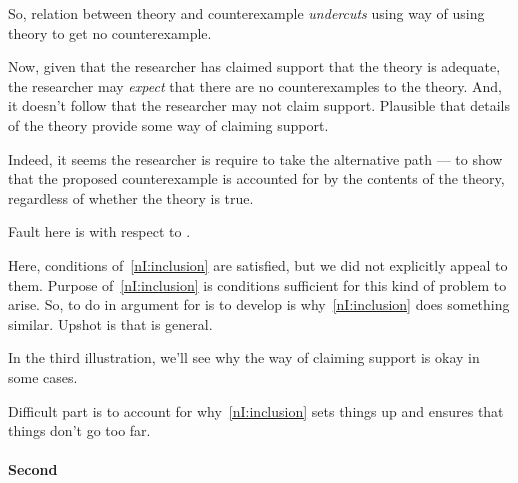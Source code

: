 \begin{note}
  So, relation between theory and counterexample \emph{undercuts} using way of using theory to get no counterexample.

  Now, given that the researcher has claimed support that the theory is adequate, the researcher may \emph{expect} that there are no counterexamples to the theory.
  And, it doesn't follow that the researcher may not claim support.
  Plausible that details of the theory provide some way of claiming support.

  Indeed, it seems the researcher is require to take the alternative path --- to show that the proposed counterexample is accounted for by the contents of the theory, regardless of whether the theory is true.

  Fault here is with respect to \ideaCS{}.
  {
    \color{red}
    Here, conditions of~\ref{nI:inclusion} are satisfied, but we did not explicitly appeal to them.
    Purpose of~\ref{nI:inclusion} is conditions sufficient for this kind of problem to arise.
    So, to do in argument for \nI{} is to develop is why~\ref{nI:inclusion} does something similar.
    Upshot is that \nI{} is general.

    In the third illustration, we'll see why the way of claiming support is okay in some cases.
  }
  Difficult part is to account for why~\ref{nI:inclusion} sets things up and ensures that things don't go too far.
\end{note}

\paragraph{Second}

